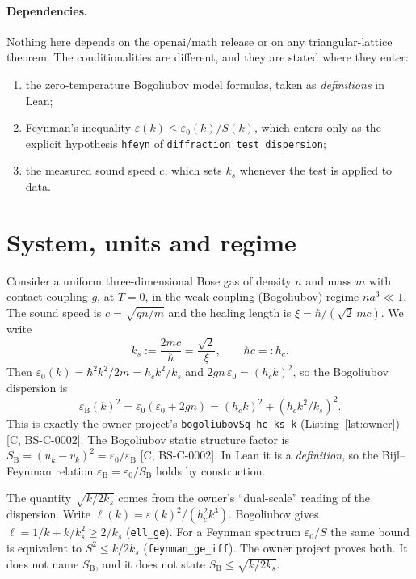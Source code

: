 \documentclass[11pt]{article}
\theoremstyle{remark}
\newcommand{\tier}[1]{\textsf{[#1]}}
\newcommand{\lean}[1]{\texttt{#1}}
\newcommand{\ks}{k_s}
\newcommand{\SB}{S_{\mathrm B}}
\newcommand{\eB}{\varepsilon_{\mathrm B}}
\begin{document}
\paragraph{Dependencies.} Nothing here depends on the openai/math release or on any triangular-lattice theorem. The
conditionalities are different, and they are stated where they enter:
\begin{enumerate}
\item the zero-temperature Bogoliubov model formulas, taken as \emph{definitions} in Lean;
\item Feynman's inequality $\varepsilon(k)\le\varepsilon_0(k)/S(k)$, which enters only as the explicit hypothesis
\lean{hfeyn} of \lean{diffraction\_test\_dispersion};
\item the measured sound speed $c$, which sets $\ks$ whenever the test is applied to data.
\end{enumerate}

\section{System, units and regime}\label{sec:physics}
Consider a uniform three-dimensional Bose gas of density $n$ and mass $m$ with contact coupling $g$, at $T=0$, in the
weak-coupling (Bogoliubov) regime $na^3\ll1$. The sound speed is $c=\sqrt{gn/m}$ and the healing length is
$\xi=\hbar/(\sqrt2\,mc)$. We write
\[
\ks:=\frac{2mc}{\hbar}=\frac{\sqrt2}{\xi},\qquad \hbar c=:h_c .
\]
Then $\varepsilon_0(k)=\hbar^2k^2/2m=h_c k^2/\ks$ and $2gn\,\varepsilon_0=(h_c k)^2$, so the Bogoliubov dispersion is
\begin{equation}\label{eq:eB}
\eB(k)^2=\varepsilon_0(\varepsilon_0+2gn)=(h_ck)^2+(h_ck^2/\ks)^2 .
\end{equation}
This is exactly the owner project's \lean{bogoliubovSq hc ks k} (Listing~\ref{lst:owner}) \tier{C, BS-C-0002}.
The Bogoliubov static structure factor is $\SB=(u_k-v_k)^2=\varepsilon_0/\eB$ \tier{C, BS-C-0002}. In Lean it is a
\emph{definition}, so the Bijl--Feynman relation $\eB=\varepsilon_0/\SB$ holds by construction.

The quantity $\sqrt{k/2\ks}$ comes from the owner's ``dual-scale'' reading of the dispersion. Write
$\ell(k)=\varepsilon(k)^2/(h_c^2k^3)$. Bogoliubov gives $\ell=1/k+k/\ks^2\ge2/\ks$ (\lean{ell\_ge}). For a Feynman
spectrum $\varepsilon_0/S$ the same bound is equivalent to $S^2\le k/2\ks$ (\lean{feynman\_ge\_iff}). The owner
project proves both. It does not name $\SB$, and it does not state $\SB\le\sqrt{k/2\ks}$.
\end{document}
